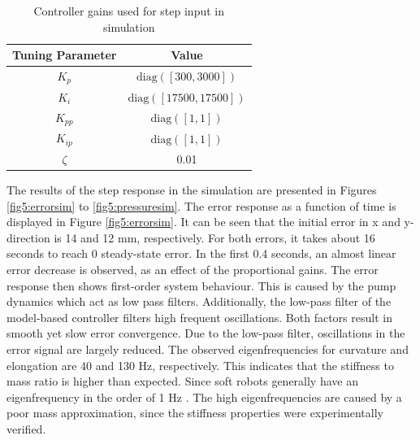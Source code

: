\begin{table}[H]
    \centering
     \caption{Controller gains used for step input in simulation}
    \begin{tabular}{|c|c|} \hline
     \textbf{Tuning Parameter}    & \textbf{Value}  \\ \hline
    $K_p$ & $\text{diag}([300,3000])$  \\ \hline
    $K_i$ & $\text{diag}([17500,17500])$  \\ \hline
    $K_{pp}$ & $\text{diag}([1,1])$  \\ \hline
    $K_{ip}$ & $\text{diag}([1,1])$ \\ \hline
    $\zeta$ & 0.01 \\ \hline
    \end{tabular}

    \label{tab5:gainssim}
\end{table}


The results of the step response in the simulation are presented in Figures \ref{fig5:errorsim} to \ref{fig5:pressuresim}. The error response as a function of time is displayed in Figure \ref{fig5:errorsim}. It can be seen that the initial error in x and y-direction is 14 and 12 mm, respectively. For both errors, it takes about 16 seconds to reach 0 steady-state error. In the first 0.4 seconds, an almost linear error decrease is observed, as an effect of the proportional gains. The error response then shows first-order system behaviour. This is caused by the pump dynamics which act as low pass filters. Additionally, the low-pass filter of the model-based controller filters high frequent oscillations. Both factors result in smooth yet slow error convergence. Due to the low-pass filter, oscillations in the error signal are largely reduced. The observed eigenfrequencies for curvature and elongation are 40 and 130 Hz, respectively. This indicates that the stiffness to mass ratio is higher than expected. Since soft robots generally have an eigenfrequency in the order of 1 Hz \cite{tawk2018bioinspired}. The high eigenfrequencies are caused by a poor mass approximation, since the stiffness properties were experimentally verified.




